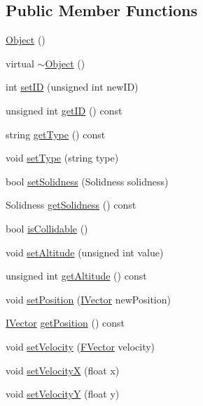 \subsection*{Public Member Functions}
\begin{DoxyCompactItemize}
\item 
\hyperlink{class_object_a40860402e64d8008fb42329df7097cdb}{Object} ()
\item 
virtual \hyperlink{class_object_ae8f5483f459e46687bd01e6f9977afd3}{$\sim$\+Object} ()
\item 
int \hyperlink{class_object_a5d973a1f45b51420a8bfb324ef2c25f7}{set\+I\+D} (unsigned int new\+I\+D)
\item 
unsigned int \hyperlink{class_object_ac62e10ee5bcc2b7855fa0bae401b2ca7}{get\+I\+D} () const 
\item 
string \hyperlink{class_object_af18945ab6296dc8f0ea0d9517446020a}{get\+Type} () const 
\item 
void \hyperlink{class_object_a4ea1a63afb9ac3fdb61dbcd23c86ce33}{set\+Type} (string type)
\item 
bool \hyperlink{class_object_aa8e7d1dab28e847c2c7308dcfdcb3530}{set\+Solidness} (Solidness solidness)
\item 
Solidness \hyperlink{class_object_a15c18dc963ca3e6b79ec5cbb7c187600}{get\+Solidness} () const 
\item 
bool \hyperlink{class_object_a0d2e685ed20b49ec1b7feeba4c0f1cc9}{is\+Collidable} ()
\item 
void \hyperlink{class_object_a996264e469eaa68ff31884fda5ba60e1}{set\+Altitude} (unsigned int value)
\item 
unsigned int \hyperlink{class_object_aa683addeedbb34a8932bbc6c2a240fab}{get\+Altitude} () const 
\item 
void \hyperlink{class_object_aaa4e4c388b9bdf9a9f341351d297c5ed}{set\+Position} (\hyperlink{class_i_vector}{I\+Vector} new\+Position)
\item 
\hyperlink{class_i_vector}{I\+Vector} \hyperlink{class_object_a548a4a71f26f3c0182dcad383a1877b9}{get\+Position} () const 
\item 
void \hyperlink{class_object_a3b8758e206b78d43da2c0e96389d9dc0}{set\+Velocity} (\hyperlink{class_f_vector}{F\+Vector} velocity)
\item 
void \hyperlink{class_object_a16ad5e2c57e31cd94dac983d26a7460f}{set\+Velocity\+X} (float x)
\item 
void \hyperlink{class_object_a0596584fa3ce951c36fcdc423911c84a}{set\+Velocity\+Y} (float y)
\item 

\end{DoxyCompactItemize}
